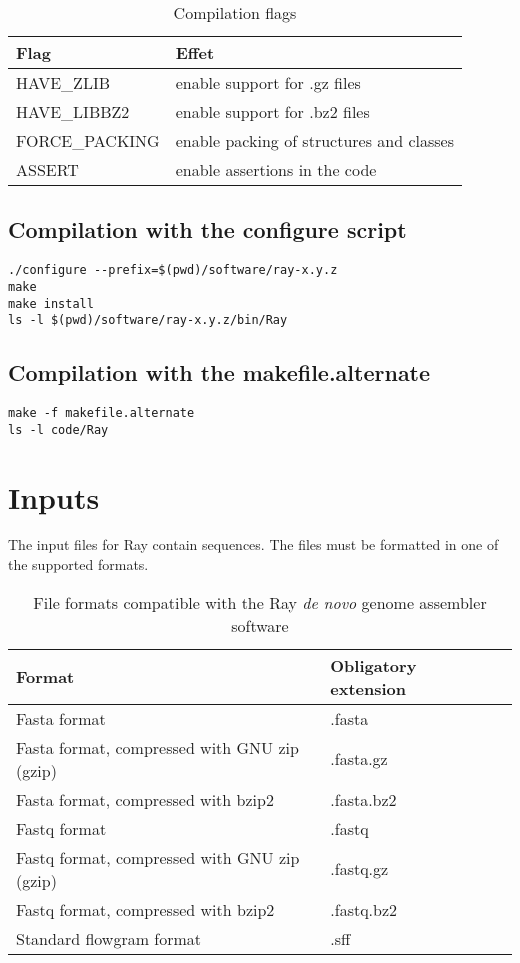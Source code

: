 \documentclass{article}
\begin{document}
\begin{table}[h]
\caption{Compilation flags}
\begin{tabular}{ll}
\hline
Flag & Effet \\
\hline
HAVE\_ZLIB & enable support for .gz files \\
HAVE\_LIBBZ2 & enable support for .bz2 files \\
FORCE\_PACKING & enable packing of structures and classes\\
ASSERT & enable assertions in the code \\
\hline
\end{tabular}
\end{table}

\subsection{Compilation with the configure script}


\begin{verbatim}
./configure --prefix=$(pwd)/software/ray-x.y.z
make
make install
ls -l $(pwd)/software/ray-x.y.z/bin/Ray
\end{verbatim}

\subsection{Compilation with the makefile.alternate}

\begin{verbatim}
make -f makefile.alternate
ls -l code/Ray
\end{verbatim}

\section{Inputs}

The input files for Ray contain sequences. The files must be formatted in one of the supported formats.

\begin{table}[h]
\caption{File formats compatible with the Ray \emph{de novo} genome assembler software}
\begin{tabular}{lll}
\hline
Format & Obligatory extension \\
\hline
Fasta format & .fasta\\
Fasta format, compressed with GNU zip (gzip) & .fasta.gz \\
Fasta format, compressed with bzip2 & .fasta.bz2 \\
Fastq format & .fastq\\
Fastq format, compressed with GNU zip (gzip) & .fastq.gz \\
Fastq format, compressed with bzip2 & .fastq.bz2 \\
Standard flowgram format & .sff \\
\hline
\end{tabular}
\end{table}
\end{document}

